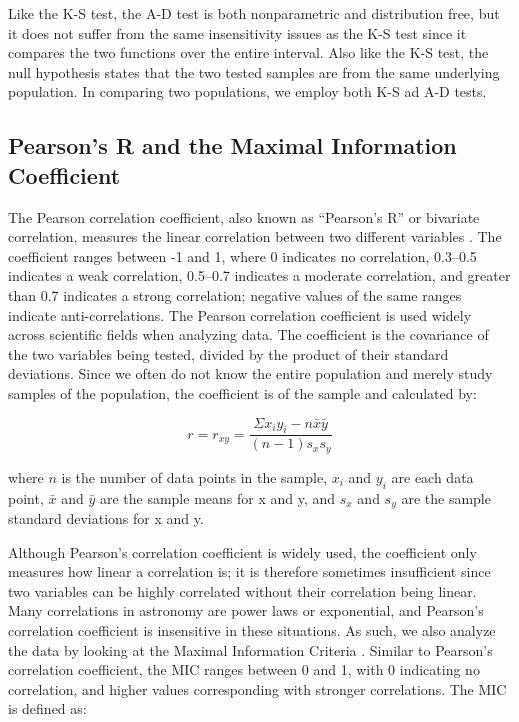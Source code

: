 \documentclass[fleqn,usenatbib]{mnras}
\begin{document}
Like the K-S test, the A-D test is both nonparametric and distribution free, but it does not suffer from the same insensitivity issues as the K-S test since it compares the two functions over the entire interval. Also like the K-S test, the null hypothesis states that the two tested samples are from the same underlying population. In comparing two populations, we employ both K-S ad A-D tests.

\subsection{Pearson's R and the Maximal Information Coefficient}
\label{ssec: r_mic}
The Pearson correlation coefficient, also known as ``Pearson's R'' or bivariate correlation, measures the linear correlation between two different variables \citep{pearson1895vii}. The coefficient ranges between -1 and 1, where 0 indicates no correlation, 0.3--0.5 indicates a weak correlation, 0.5--0.7 indicates a moderate correlation, and greater than 0.7 indicates a strong correlation; negative values of the same ranges indicate anti-correlations. The Pearson correlation coefficient is used widely across scientific fields when analyzing data. The coefficient is the covariance of the two variables being tested, divided by the product of their standard deviations. Since we often do not know the entire population and merely study samples of the population, the coefficient is of the sample and calculated by:

\begin{equation}
r=r_{xy}=\frac{\Sigma x_iy_i-n\bar{x}\bar{y}}{(n-1)s_xs_y}
\end{equation}

\noindent where $n$ is the number of data points in the sample, $x_i$ and $y_i$ are each data point, $\bar{x}$ and $\bar{y}$ are the sample means for x and y, and $s_x$ and $s_y$ are the sample standard deviations for x and y.

Although Pearson's correlation coefficient is widely used, the coefficient only measures how linear a correlation is; it is therefore sometimes insufficient since two variables can be highly correlated without their correlation being linear. Many correlations in astronomy are power laws or exponential, and Pearson's correlation coefficient is insensitive in these situations. As such, we also analyze the data by looking at the Maximal Information Criteria \citep[MIC, ][]{reshef2011detecting}. Similar to Pearson's correlation coefficient, the MIC ranges between 0 and 1, with 0 indicating no correlation, and higher values corresponding with stronger correlations. The MIC is defined as:
\end{document}
